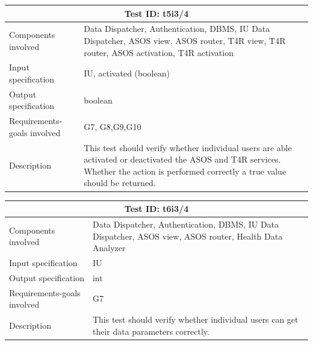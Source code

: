 \begin{table}[H]
\centering
\begin{tabular}{ |p{4.5cm}||p{11cm}|  }
 \hline
 \multicolumn{2}{|c|}{Test ID: t5i3/4} \\
 
 \hline 
 Components involved  	&    Data Dispatcher, Authentication, DBMS, IU Data Dispatcher, ASOS view, ASOS router, T4R view, T4R router, ASOS activation, T4R activation\\
 Input specification  	&  	 IU, activated (boolean)\\
Output specification  	& 	  	boolean\\
Requirements-goals involved &  G7, G8,G9,G10\\
Description  	& 	 	   This test should verify whether individual users are able activated or deactivated the ASOS and T4R services. Whether the action is performed correctly a true value should be returned. \\
 \hline
\end{tabular}
\end{table}
\begin{table}[H]
\centering
\begin{tabular}{ |p{4.5cm}||p{11cm}|  }
 \hline
 \multicolumn{2}{|c|}{Test ID: t6i3/4} \\
 
 \hline 
 Components involved  	&    Data Dispatcher, Authentication, DBMS, IU Data Dispatcher,  ASOS view, ASOS router, Health Data Analyzer\\
 Input specification  	&  	 IU\\
Output specification  	& 	  	int\\
Requirements-goals involved &  G7\\
Description  	& 	 	   This test should verify whether individual users can get their data parameters correctly. \\
 \hline
\end{tabular}
\end{table}
